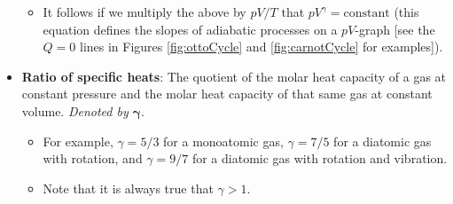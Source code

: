 \documentclass[../notes.tex]{subfiles}
\begin{document}
\begin{itemize}
\begin{itemize}
        \item It follows if we multiply the above by $pV/T$ that $pV^\gamma=\text{constant}$ (this equation defines the slopes of adiabatic processes on a $pV$-graph [see the $Q=0$ lines in Figures \ref{fig:ottoCycle} and \ref{fig:carnotCycle} for examples]).
    \end{itemize}
    \item \textbf{Ratio of specific heats}: The quotient of the molar heat capacity of a gas at constant pressure and the molar heat capacity of that same gas at constant volume. \emph{Denoted by} $\bm{\gamma}$.
    \begin{itemize}
        \item For example, $\gamma=5/3$ for a monoatomic gas, $\gamma=7/5$ for a diatomic gas with rotation, and $\gamma=9/7$ for a diatomic gas with rotation and vibration.
        \item Note that it is always true that $\gamma>1$.
    \end{itemize}
\end{itemize}
\end{document}
